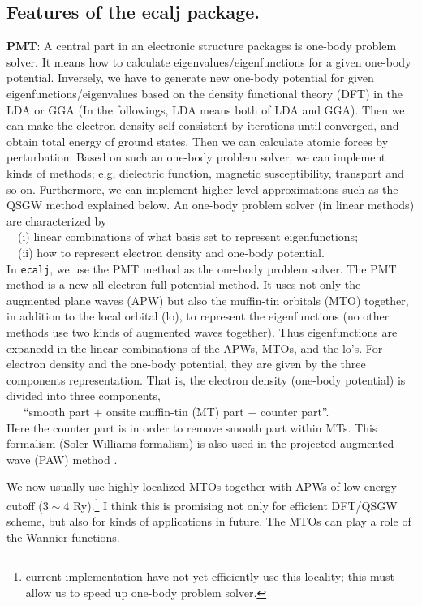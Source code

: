\documentclass[a4paper,10pt,epsf,fleqn]{article}
\def\ecalj{\texttt{ecalj}}
\begin{document}
\subsection{Features of the ecalj package.}
\label{sec:fecalj}
{\bf PMT}:
A central part in an electronic structure packages is one-body problem solver. 
It means how to calculate eigenvalues/eigenfunctions for a
given one-body potential. Inversely, we have to generate new one-body potential 
for given eigenfunctions/eigenvalues
based on the density functional theory (DFT) in the LDA or GGA
(In the followings, LDA means both of LDA and GGA).
Then we can make the electron density self-consistent by iterations
until converged, and obtain total energy of ground states.
Then we can calculate atomic forces by perturbation.
Based on such an one-body problem solver, 
we can implement kinds of methods; e.g, dielectric function, magnetic
susceptibility, transport and so on.
Furthermore, we can implement higher-level approximations 
such as the QSGW method explained below.
An one-body problem solver (in linear methods) are
characterized by \\
\ \ (i) linear combinations of what basis set to represent eigenfunctions; \\
\ \ (ii) how to represent electron density and one-body potential. \\
In \ecalj, we use the PMT method \cite{Kotani2010,Kotani2013} as the one-body problem solver.
The PMT method is a new all-electron full potential method. It uses not only the
augmented plane waves (APW) but also the muffin-tin orbitals (MTO) together,
in addition to the local orbital (lo), to represent the eigenfunctions
(no other methods use two kinds of augmented waves together).
Thus eigenfunctions are expanedd in the linear combinations of the
APWs, MTOs, and the lo's.
For electron density and the one-body potential, they are given
by the three components representation. That is, the electron density
(one-body potential) is divided into three components, \\
\ \ \ ``smooth part $+$ onsite muffin-tin (MT) part $-$ counter part''. \\
Here the counter part is in order to remove smooth part within MTs.
This formalism (Soler-Williams formalism) is also used in
the projected augmented wave (PAW) method \cite{soler89,soler90}.

We now usually use highly localized MTOs
together with APWs of low energy cutoff ($3\sim 4$ Ry).\footnote{current
implementation have not yet efficiently use this locality; this must allow
us to speed up one-body problem solver.} 
I think this is promising not only for efficient DFT/QSGW scheme, 
but also for kinds of applications in future. 
The MTOs can play a role of the Wannier functions.\\
\end{document}
